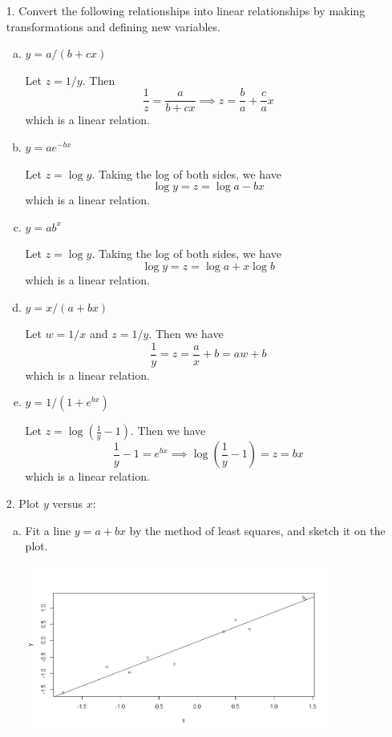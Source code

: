 \documentclass{article}
\begin{document}
\begin{itemize}
	\item[1.] Convert the following relationships into linear relationships by making transformations and defining new variables.
		\begin{enumerate}[a.]
			\item $y=a/(b+cx)$
				\begin{soln}
					Let $z=1/y.$ Then \[\frac{1}{z} = \frac{a}{b+cx} \implies z = \frac{b}{a} + \frac{c}{a}x\] which is a linear relation.
				\end{soln}

			\item $y=ae^{-bx}$
				\begin{soln}
					Let $z=\log y.$ Taking the log of both sides, we have \[\log y = z = \log a - bx\] which is a linear relation.
				\end{soln}

			\item $y=ab^x$
				\begin{soln}
					Let $z=\log y.$ Taking the log of both sides, we have \[\log y = z = \log a+x\log b\] which is a linear relation.
				\end{soln}

			\item $y=x/(a+bx)$
				\begin{soln}
					Let $w=1/x$ and $z=1/y.$ Then we have \[\frac{1}{y} = z = \frac{a}{x} + b = aw + b\] which is a linear relation.
				\end{soln}

			\item $y=1/(1+e^{bx})$
				\begin{soln}
					Let $z=\log\left( \frac{1}{y} - 1 \right).$ Then we have \[\frac{1}{y} - 1 = e^{bx} \implies \log \left( \frac{1}{y} - 1 \right) = z = bx\] which is a linear relation.
				\end{soln}
				
		\end{enumerate}

	\item[2.] Plot $y$ versus $x:$
		\begin{enumerate}[a.]
			\item Fit a line $y=a+bx$ by the method of least squares, and sketch it on the plot.
				\begin{center}
					\includegraphics[width=10cm]{reg_x.png}
				\end{center}
				

\end{enumerate}
\end{itemize}
\end{document}
